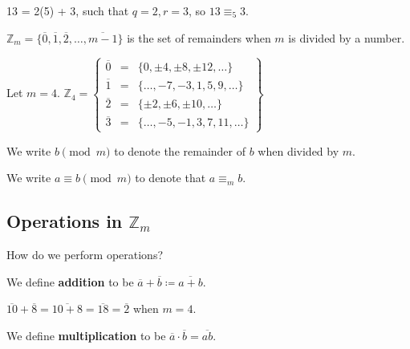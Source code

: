 \documentclass[a4paper]{article}
\begin{document}
\begin{eg}
	13 = 2(5) + 3, such that \( q=2,r=3 \), so \( 13 \equiv_5 3 \). 
\end{eg}

\begin{definition}
	\( \mathbb{Z}_m = \{\overline{0}   ,\overline{1} ,\overline{2} ,\ldots ,\overline{m-1} \}  \) is the set of remainders when \( m \) is divided by a number.
\end{definition}

\begin{eg}
	Let \( m=4 \). \( \mathbb{Z}_4 = \begin{Bmatrix} \overline{0}&=&\{0,\pm 4,\pm 8,\pm 12,\ldots \} \\ \overline{1}&=&\{\ldots ,-7,-3, 1,5,9,\ldots \} \\ \overline{2}&=&\{\pm 2, \pm 6, \pm 10, \ldots \} \\ \overline{3}&=&\{\ldots ,-5,-1,3,7,11,\ldots \}           \end{Bmatrix}   \) 
\end{eg}

\begin{notation}
	We write \( b \pmod m \) to denote the remainder of \( b \) when divided by \( m \).
\end{notation}

\begin{notation}
	We write \( a \equiv b \pmod m \) to denote that \( a \equiv_m b \).
\end{notation}

\subsection{Operations in \( \mathbb{Z}_m \)}

How do we perform operations?

\begin{definition}
	We define \textbf{addition} to be \( \overline{a}+\overline{b} \coloneq \overline{a+b}     \).
\end{definition}

\begin{eg}
	\( \overline{10}+\overline{8}=\overline{10+8}=\overline{18}=\overline{2}    \) when \( m=4 \).
\end{eg}

\begin{definition}
	We define \textbf{multiplication} to be \( \overline{a}\cdot \overline{b}=\overline{ab}    \).
\end{definition}
\end{document}
